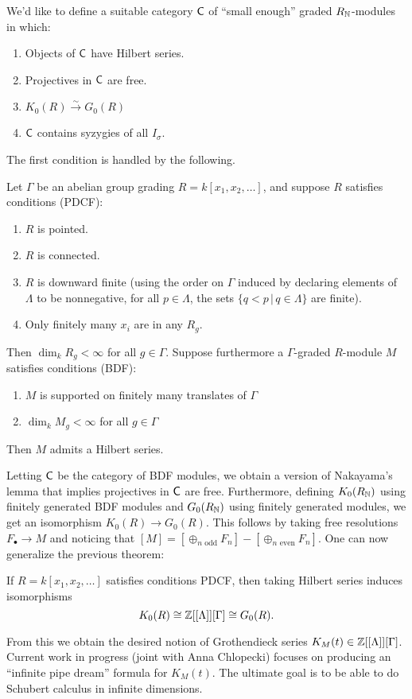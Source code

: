 \documentclass{amsart}
\begin{document}
We'd like to define a suitable category $\mathsf{C}$ of ``small enough'' graded $R_{\mathbb{N}}$-modules in which:
\begin{enumerate}
	\item Objects of $\mathsf{C}$ have Hilbert series.
	\item Projectives in $\mathsf{C}$ are free.
	\item $K_0(R) \xrightarrow{\sim} G_0(R)$
	\item $\mathsf{C}$ contains syzygies of all $I_\sigma$.
\end{enumerate}

The first condition is handled by the following.

\begin{prop}
	Let $\Gamma$ be an abelian group grading $R = k[x_1, x_2, \dots]$, and suppose $R$ satisfies conditions (PDCF):
	\begin{enumerate}
		\item $R$ is pointed.
		\item $R$ is connected.
		\item $R$ is downward finite (using the order on $\Gamma$ induced by declaring elements of $\Lambda$ to be nonnegative, for all $p \in \Lambda$, the sets $\{ q < p \,|\, q \in \Lambda \}$ are finite).
		\item Only finitely many $x_i$ are in any $R_g$.
	\end{enumerate}
	Then $\dim_k R_g < \infty$ for all $g \in \Gamma$.
	Suppose furthermore a $\Gamma$-graded $R$-module $M$ satisfies conditions (BDF):
	\begin{enumerate}
		\item $M$ is supported on finitely many translates of $\Gamma$
		\item $\dim_k M_g < \infty$ for all $g \in \Gamma$
	\end{enumerate}
	Then $M$ admits a Hilbert series.
\end{prop}

Letting $\mathsf{C}$ be the category of BDF modules, we obtain a version of Nakayama's lemma that implies projectives in $\mathsf{C}$ are free.
Furthermore, defining $K_0(R_{\mathbb{N}})$ using finitely generated BDF modules and $G_0(R_{\mathbb{N}})$ using finitely generated modules, we get an isomorphism $K_0(R) \to G_0(R)$.
This follows by taking free resolutions $F_\bullet \to M$ and noticing that $[M] = \left[\oplus_{n \textrm{ odd}} F_n\right] - \left[\oplus_{n \textrm{ even}} F_n\right]$.
One can now generalize the previous theorem:

\begin{thm}
	If $R = k[x_1, x_2, \dots]$ satisfies conditions PDCF, then taking Hilbert series induces isomorphisms 
	\[
		K_0(R) \cong \mathbb{Z}[[\Lambda]][\Gamma] \cong G_0(R).
	\]
\end{thm}

From this we obtain the desired notion of Grothendieck series $K_M(t) \in \mathbb{Z}[[\Lambda]][\Gamma]$.
Current work in progress (joint with Anna Chlopecki) focuses on producing an ``infinite pipe dream'' formula for $K_M(t)$.
The ultimate goal is to be able to do Schubert calculus in infinite dimensions.
\end{document}
